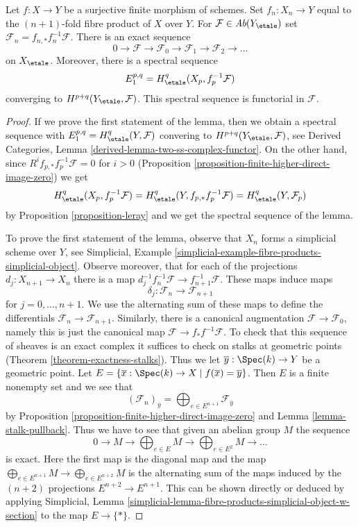 \begin{lemma}
\label{lemma-cohomological-descent-finite}
Let $f : X \to Y$ be a surjective finite morphism of schemes.
Set $f_n : X_n \to Y$ equal to the $(n + 1)$-fold fibre product
of $X$ over $Y$. For $\mathcal{F} \in \textit{Ab}(Y_\etale)$ set
$\mathcal{F}_n = f_{n, *}f_n^{-1}\mathcal{F}$. There is an exact
sequence
$$
0 \to \mathcal{F} \to \mathcal{F}_0 \to \mathcal{F}_1 \to
\mathcal{F}_2 \to \ldots
$$
on $X_\etale$. Moreover, there is a spectral sequence
$$
E_1^{p, q} = H^q_\etale(X_p, f_p^{-1}\mathcal{F})
$$
converging to $H^{p + q}(Y_\etale, \mathcal{F})$.
This spectral sequence is functorial in $\mathcal{F}$.
\end{lemma}

\begin{proof}
If we prove the first statement of the lemma, then we obtain a spectral
sequence with $E_1^{p, q} = H^q_\etale(Y, \mathcal{F})$ convering
to $H^{p + q}(Y_\etale, \mathcal{F})$, see
Derived Categories, Lemma \ref{derived-lemma-two-ss-complex-functor}.
On the other hand, since
$R^if_{p, *}f_p^{-1}\mathcal{F} = 0$ for $i > 0$
(Proposition \ref{proposition-finite-higher-direct-image-zero})
we get
$$
H^q_\etale(X_p, f_p^{-1}\mathcal{F}) =
H^q_\etale(Y, f_{p, *}f_p^{-1} \mathcal{F}) =
H^q_\etale(Y, \mathcal{F}_p)
$$
by Proposition \ref{proposition-leray}
and we get the spectral sequence of the lemma.

\medskip\noindent
To prove the first statement of the lemma, observe that
$X_n$ forms a simplicial scheme over $Y$, see
Simplicial, Example \ref{simplicial-example-fibre-products-simplicial-object}.
Observe moreover, that for each of the projections
$d_j : X_{n + 1} \to X_n$ there is a map
$d_j^{-1} f_n^{-1}\mathcal{F} \to f_{n + 1}^{-1}\mathcal{F}$.
These maps induce maps
$$
\delta_j : \mathcal{F}_n \to \mathcal{F}_{n + 1}
$$
for $j = 0, \ldots, n + 1$. We use the alternating sum of these maps
to define the differentials $\mathcal{F}_n \to \mathcal{F}_{n + 1}$.
Similarly, there is a canonical augmentation $\mathcal{F} \to \mathcal{F}_0$,
namely this is just the canonical map $\mathcal{F} \to f_*f^{-1}\mathcal{F}$.
To check that this sequence of sheaves is an exact complex it suffices
to check on stalks at geometric points (Theorem \ref{theorem-exactness-stalks}).
Thus we let $\overline{y} : \Spec(k) \to Y$ be a geometric point. Let
$E = \{\overline{x} : \Spec(k) \to X \mid f(\overline{x}) = \overline{y}\}$.
Then $E$ is a finite nonempty set and we see that
$$
(\mathcal{F}_n)_{\overline{y}} =
\bigoplus\nolimits_{e \in E^{n + 1}} \mathcal{F}_{\overline{y}}
$$
by Proposition \ref{proposition-finite-higher-direct-image-zero}
and Lemma \ref{lemma-stalk-pullback}.
Thus we have to see that given an abelian group $M$ the sequence
$$
0 \to M \to \bigoplus\nolimits_{e \in E} M \to
\bigoplus\nolimits_{e \in E^2} M \to \ldots
$$
is exact. Here the first map is the diagonal map and the map
$\bigoplus_{e \in E^{n + 1}} M  \to \bigoplus_{e \in E^{n + 2}} M$
is the alternating sum of the maps induced by the $(n + 2)$
projections $E^{n + 2} \to E^{n + 1}$. This can be shown directly
or deduced by applying Simplicial, Lemma
\ref{simplicial-lemma-fibre-products-simplicial-object-w-section}
to the map $E \to \{*\}$.
\end{proof}

